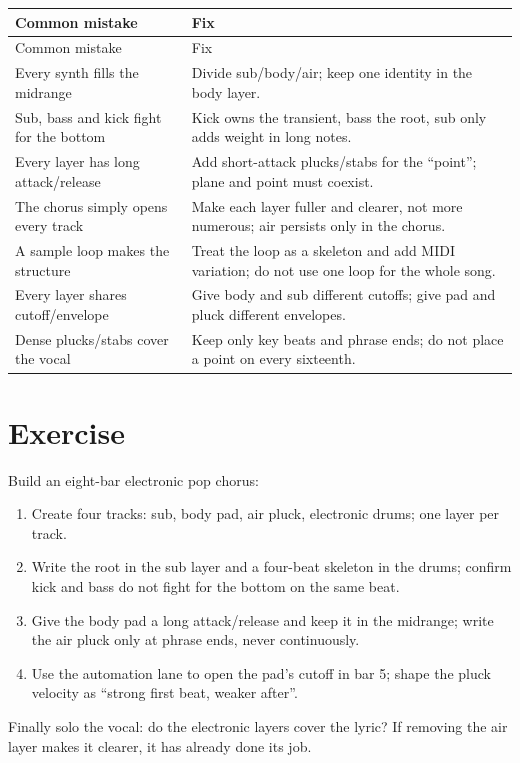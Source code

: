 \begin{longtable}{p{}p{}}
\toprule
Common mistake & Fix \\
\midrule
\endfirsthead
\toprule
Common mistake & Fix \\
\midrule
\endhead
Every synth fills the midrange & Divide sub/body/air; keep one identity in the body layer. \\
Sub, bass and kick fight for the bottom & Kick owns the transient, bass the root, sub only adds weight in long notes. \\
Every layer has long attack/release & Add short-attack plucks/stabs for the ``point''; plane and point must coexist. \\
The chorus simply opens every track & Make each layer fuller and clearer, not more numerous; air persists only in the chorus. \\
A sample loop makes the structure & Treat the loop as a skeleton and add MIDI variation; do not use one loop for the whole song. \\
Every layer shares cutoff/envelope & Give body and sub different cutoffs; give pad and pluck different envelopes. \\
Dense plucks/stabs cover the vocal & Keep only key beats and phrase ends; do not place a point on every sixteenth. \\
\bottomrule
\end{longtable}

\section{Exercise}
\label{sec:electronic-exercise}

\begin{exercise}
Build an eight-bar electronic pop chorus:
\begin{enumerate}
\item Create four tracks: sub, body pad, air pluck, electronic drums; one layer per track.
\item Write the root in the sub layer and a four-beat skeleton in the drums; confirm kick and bass do not fight for the bottom on the same beat.
\item Give the body pad a long attack/release and keep it in the midrange; write the air pluck only at phrase ends, never continuously.
\item Use the automation lane to open the pad's cutoff in bar 5; shape the pluck velocity as ``strong first beat, weaker after''.
\end{enumerate}
Finally solo the vocal: do the electronic layers cover the lyric? If removing the air layer makes it clearer, it has already done its job.
\end{exercise}

